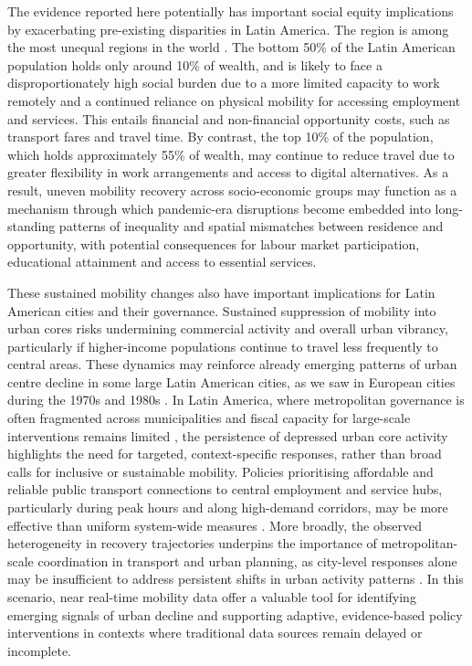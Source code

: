 \documentclass[fleqn,10pt]{wlscirep}
\begin{document}
The evidence reported here potentially has important social equity implications by exacerbating pre-existing disparities in Latin America. The region is among the most unequal regions in the world \cite{WIReport22}. The bottom 50\% of the Latin American population holds only around 10\% of wealth\cite{WIReport22}, and is likely to face a disproportionately high social burden due to a more limited capacity to work remotely and a continued reliance on physical mobility for accessing employment and services. This entails financial and non-financial opportunity costs, such as transport fares and travel time. By contrast, the top 10\% of the population, which holds approximately 55\% of wealth\cite{WIReport22}, may continue to reduce travel due to greater flexibility in work arrangements and access to digital alternatives. As a result, uneven mobility recovery across socio-economic groups may function as a mechanism through which pandemic-era disruptions become embedded into long-standing patterns of inequality and spatial mismatches between residence and opportunity, with potential consequences for labour market participation, educational attainment and access to essential services. 

These sustained mobility changes also have important implications for Latin American cities and their governance. Sustained suppression of mobility into urban cores risks undermining commercial activity and overall urban vibrancy, particularly if higher-income populations continue to travel less frequently to central areas. These dynamics may reinforce already emerging patterns of urban centre decline in some large Latin American cities, as we saw in European cities during the 1970s and 1980s \cite{THORSTEN}. In Latin America, where metropolitan governance is often fragmented across municipalities and fiscal capacity for large-scale interventions remains limited \cite{un2022world, inostroza2013urban, fay2017rethinking, irazabal20governance}, the persistence of depressed urban core activity highlights the need for targeted, context-specific responses, rather than broad calls for inclusive or sustainable mobility. Policies prioritising affordable and reliable public transport connections to central employment and service hubs, particularly during peak hours and along high-demand corridors, may be more effective than uniform system-wide measures \cite{rivas2019urban, guzman2022effects}. More broadly, the observed heterogeneity in recovery trajectories underpins the importance of metropolitan-scale coordination in transport and urban planning, as city-level responses alone may be insufficient to address persistent shifts in urban activity patterns \cite{duque2021institutional}. In this scenario, near real-time mobility data offer a valuable tool for identifying emerging signals of urban decline and supporting adaptive, evidence-based policy interventions in contexts where traditional data sources remain delayed or incomplete.
\end{document}
